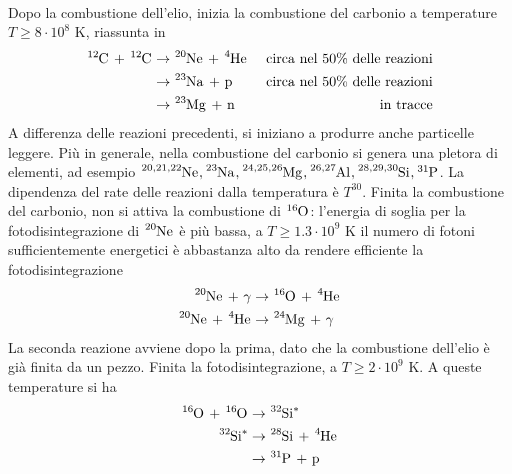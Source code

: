 \documentclass[a4paper,11pt]{article}
\theoremstyle{theorem}
\theoremstyle{definition}
\begin{document}
\begin{itemize}
\begin{align*}
		\end{align*}
		Dopo la combustione dell'elio, inizia la combustione del carbonio a temperature $T\geq 8\cdot10^8$ K, riassunta in 
		\begin{align*}
			\tensor[^{12}]{\mathrm{C}}{}\textrm{ + }\tensor[^{12}]{\mathrm{C}}{}&\rightarrow\tensor[^{20}]{\mathrm{Ne}}{}\textrm{ + }\tensor[^4]{\textrm{He}}{}&\textrm{ circa nel 50\% delle reazioni}\\
			&\rightarrow\tensor[^{23}]{\mathrm{Na}}{}\textrm{ + p}&\textrm{ circa nel 50\% delle reazioni}\\
			&\rightarrow\tensor[^{23}]{\mathrm{Mg}}{}\textrm{ + n}&\textrm{ in tracce}\\
		\end{align*}
		A differenza delle reazioni precedenti, si iniziano a produrre anche particelle leggere. Più in generale, nella combustione del carbonio si genera una pletora di elementi, ad esempio $\tensor[^{20,21,22}]{\mathrm{Ne}}{},\tensor[^{23}]{\mathrm{Na}}{},\tensor[^{24,25,26}]{\mathrm{Mg}}{},\tensor[^{26,27}]{\mathrm{Al}}{},\tensor[^{28,29,30}]{\mathrm{Si}}{},\tensor[^{31}]{\mathrm{P}}{}$. La dipendenza del rate delle reazioni dalla temperatura è $T^{30}$. Finita la combustione del carbonio, non si attiva la combustione di $\tensor[^{16}]{\mathrm{O}}{}$: l'energia di soglia per la fotodisintegrazione di $\tensor[^{20}]{\mathrm{Ne}}{}$ è più bassa, a $T\geq 1.3\cdot10^9$ K il numero di fotoni sufficientemente energetici è abbastanza alto da rendere efficiente la fotodisintegrazione
		\begin{align*}
			\tensor[^{20}]{\mathrm{Ne}}{}\textrm{ + }\gamma&\rightarrow \tensor[^{16}]{\mathrm{O}}{}\textrm{ + }\tensor[^{4}]{\mathrm{He}}{}\\
			\tensor[^{20}]{\mathrm{Ne}}{}\textrm{ + }\tensor[^{4}]{\mathrm{He}}{}&\rightarrow\tensor[^{24}]{\mathrm{Mg}}{}\textrm{ + }\gamma
		\end{align*}
		La seconda reazione avviene dopo la prima, dato che la combustione dell'elio è già finita da un pezzo. Finita la fotodisintegrazione, a $T\geq 2\cdot10^9$ K. A queste temperature si ha
		\begin{align*}
			\tensor[^{16}]{\mathrm{O}}{}\textrm{ + }\tensor[^{16}]{\mathrm{O}}{}&\rightarrow\tensor[^{32}]{\mathrm{Si}}{^*}\\
			\tensor[^{32}]{\mathrm{Si}}{^*}&\rightarrow \tensor[^{28}]{\mathrm{Si}}{}\textrm{ + }\tensor[^{4}]{\mathrm{He}}{}\\
			&\rightarrow \tensor[^{31}]{\mathrm{P}}{}\textrm{ + p}\\

\end{align*}
\end{itemize}
\end{document}
